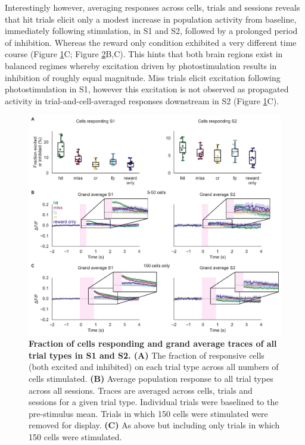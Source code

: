 \begin{figure}[htbp]
{} 
\label{fig:basic-analysis}
\end{figure}

Interestingly however, averaging responses across cells, trials and sessions reveals that hit trials elicit only a modest increase in population activity from baseline, immediately following stimulation, in S1 and S2, followed by a prolonged period of inhibition. Whereas the reward only condition exhibited a very different time course (Figure \ref{fig:basic-analysis}C; Figure \ref{fig:supp1}B,C). This hints that both brain regions exist in balanced regimes whereby excitation driven by photostimulation results in inhibition of roughly equal magnitude. Miss trials elicit excitation following photostimulation in S1, however this excitation is not observed as propagated activity in trial-and-cell-averaged responses downstream in S2 (Figure \ref{fig:basic-analysis}C). 


\begin{figure}[h]
\hspace*{-0.25in}
\includegraphics[scale=0.65]{figures/supplements/Supplementary_Figure1.pdf}
\caption[\textbf{Fraction of cells responding and grand average traces of all trial types in S1 and S2}]{\textbf{ Fraction of cells responding and grand average traces of all trial types in S1 and S2.
 (A)} The fraction of responsive cells (both excited and inhibited) on each trial type across all numbers of cells stimulated. \textbf{(B)} Average population response to all trial types across all sessions. Traces are averaged across cells, trials and sessions for a given trial type. Individual trials were baselined to the pre-stimulus mean. Trials in which 150 cells were stimulated were removed for display. \textbf{(C)} As above but including only trials in which 150 cells were stimulated. 
} 
\label{fig:supp1}
\end{figure}


